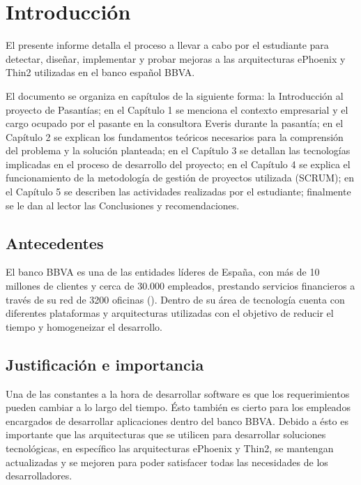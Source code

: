 \chapter*{Introducción}
\label{intro}
El presente informe detalla el proceso a llevar a cabo por el estudiante
para detectar, diseñar, implementar y probar mejoras a las arquitecturas
ePhoenix y Thin2 utilizadas en el banco español BBVA.

El documento se organiza en capítulos de la siguiente forma: la
Introducción al proyecto de Pasantías; en el Capítulo 1 se menciona
el contexto empresarial y el cargo ocupado por el pasante en la
consultora Everis durante la pasantía; en el Capítulo 2 se explican
los fundamentos teóricos necesarios para la comprensión del problema y
la solución planteada; en el Capítulo 3 se detallan las tecnologías
implicadas en el proceso de desarrollo del proyecto; en el Capítulo 4 se
explica el funcionamiento de la metodología de gestión de proyectos utilizada
(SCRUM); en el Capítulo 5 se describen las actividades realizadas por el
estudiante; finalmente se le dan al lector las Conclusiones y recomendaciones.

\section*{Antecedentes}
El banco BBVA es una de las entidades líderes de España, con más de 10
millones de clientes y cerca de 30.000 empleados, prestando servicios
financieros a través de su red de 3200 oficinas (\cite{BBVA}). Dentro de
su área de tecnología cuenta con diferentes plataformas y arquitecturas
utilizadas con el objetivo de reducir el tiempo y homogeneizar el desarrollo.

\section*{Justificación e importancia}
Una de las constantes a la hora de desarrollar software es que los
requerimientos pueden cambiar a lo largo del tiempo. Ésto también
es cierto para los empleados encargados de desarrollar aplicaciones
dentro del banco BBVA. Debido a ésto es importante que las arquitecturas
que se utilicen para desarrollar soluciones tecnológicas, en específico
las arquitecturas ePhoenix y Thin2, se mantengan actualizadas y se mejoren
para poder satisfacer todas las necesidades de los desarrolladores.

